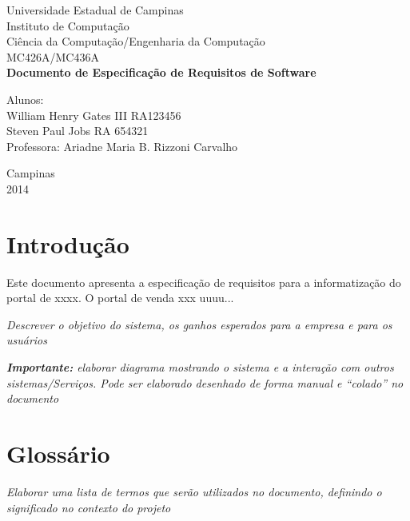 \documentclass[12pt,a4paper]{article}
\begin{document}

\begin{titlepage}
\begin{center}
{\large Universidade Estadual de Campinas}\\[0.2cm]
{\large Instituto de Computação}\\[0.2cm]
{\large Ciência da Computação/Engenharia da Computação}\\[0.2cm]
{\large MC426A/MC436A}\\[5.1cm]
{\bf \huge Documento de Especificação de Requisitos de Software}\\[5.1cm]
\end{center}
{\large Alunos:\\William Henry Gates III RA123456\\ Steven Paul Jobs RA 654321}\\[0.7cm]
{\large Professora: Ariadne Maria B. Rizzoni Carvalho}\\[3.1cm]
\begin{center}
{\large Campinas}\\[0.2cm]
{\large 2014}
\end{center}
\end{titlepage}


\tableofcontents
\afterpage{\cfoot{\thepage}}

\newpage

\section{Introdução}

Este documento apresenta a especificação de requisitos para a informatização do portal de xxxx.  O portal de venda xxx uuuu...

\textit{Descrever o objetivo do sistema, os ganhos esperados para a empresa e para os usuários}

\textit{\textbf{Importante:} elaborar diagrama mostrando o sistema e a interação com outros sistemas/Serviços. Pode ser elaborado desenhado de forma manual e “colado” no documento} 


\section{Glossário}
\textit{Elaborar uma lista de termos que serão utilizados no documento, definindo o significado no contexto do projeto}
\end{document}
